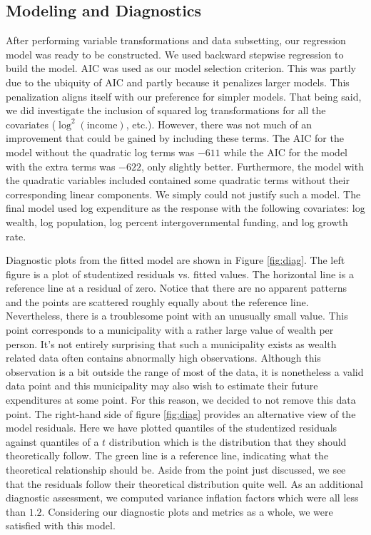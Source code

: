 \documentclass{article}\usepackage[]{graphicx}\usepackage[]{color}
\begin{document}
\subsection{Modeling and Diagnostics} \label{modeling}

After performing variable transformations and data subsetting, our regression model was ready to be constructed. We used backward stepwise regression to build the model. AIC was used as our model selection criterion. This was partly due to the ubiquity of AIC and partly because it penalizes larger models. This penalization aligns itself with our preference for simpler models. That being said, we did investigate the inclusion of squared log transformations for all the covariates ($\log^2(\text{income})$, etc.). However, there was not much of an improvement that could be gained by including these terms. The AIC for the model without the quadratic log terms was $-611$ while the AIC for the model with the extra terms was $-622$, only slightly better. Furthermore, the model with the quadratic variables included contained some quadratic terms without their corresponding linear components. We simply could not justify such a model. The final model used log expenditure as the response with the following covariates: log wealth, log population, log percent intergovernmental funding, and log growth rate.



Diagnostic plots from the fitted model are shown in Figure \ref{fig:diag}. The left figure is a plot of studentized residuals vs. fitted values. The horizontal line is a reference line at a residual of zero. Notice that there are no apparent patterns and the points are scattered roughly equally about the reference line. Nevertheless, there is a troublesome point with an unusually small value. This point corresponds to a municipality with a rather large value of wealth per person. It's not entirely surprising that such a municipality exists as wealth related data often contains abnormally high observations. Although this observation is a bit outside the range of most of the data, it is nonetheless a valid data point and this municipality may also wish to estimate their future expenditures at some point. For this reason, we decided to not remove this data point. The right-hand side of figure \ref{fig:diag} provides an alternative view of the model residuals. Here we have plotted quantiles of the studentized residuals against quantiles of a $t$ distribution which is the distribution that they should theoretically follow. The green line is a reference line, indicating what the theoretical relationship should be. Aside from the point just discussed, we see that the residuals follow their theoretical distribution quite well. As an additional diagnostic assessment, we computed variance inflation factors which were all less than $1.2$. Considering our diagnostic plots and metrics as a whole, we were satisfied with this model.
\end{document}

